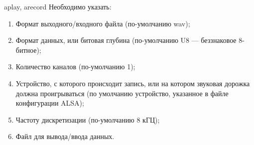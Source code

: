 \begin{frame}{aplay, arecord}
  Необходимо указать:
  
  \begin{enumerate}
    \item Формат выходного/входного файла (по-умолчанию wav);
    \item Формат данных, или битовая глубина (по-умолчанию U8 --- беззнаковое 8-битное);
    \item Количество каналов (по-умолчанию 1);
    \item Устройство, с которого происходит запись, или на котором звуковая дорожка должна проигрываться (по умолчанию устройство, указанное в файле конфигурации ALSA);
    \item Частоту дискретизации (по-умолчанию 8 кГЦ);
    \item Файл для вывода/ввода данных.
  \end{enumerate}
\end{frame}